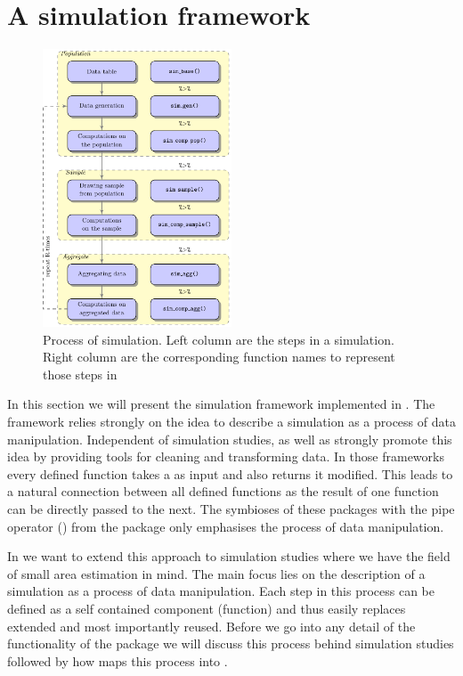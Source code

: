 \documentclass[article]{ajs}
\begin{document}
\section{A simulation framework}
\label{sec:framework}
%
\begin{figure}
\begin{center}
\includegraphics[width=0.5\textwidth]{flowdiagram}
\end{center}
\caption{\label{fig:flowdiagram}Process of simulation. Left column are the steps in a simulation. Right column are the corresponding function names to represent those steps in } 
\end{figure}
%
In this section we will present the simulation framework implemented in . The framework relies strongly on the idea to describe a simulation as a process of data manipulation. Independent of simulation studies, \cite{wickham14a} as well as \cite{wickham14b} strongly promote this idea by providing tools for cleaning and transforming data. In those frameworks every defined function takes a  as input and also returns it modified. This leads to a natural connection between all defined functions as the result of one function can be directly passed to the next. The symbioses of these packages with the pipe operator (\proglang{\%>\%}) from the package  \citep{bache14} only emphasises the process of data manipulation. 

In  we want to extend this approach to simulation studies where we have the field of small area estimation in mind. The main focus lies on the description of a simulation as a process of data manipulation. Each step in this process can be defined as a self contained component (function) and thus easily replaces extended and most importantly reused. Before we go into any detail of the functionality of the package we will discuss this process behind simulation studies followed by how  maps this process into .
\end{document}

